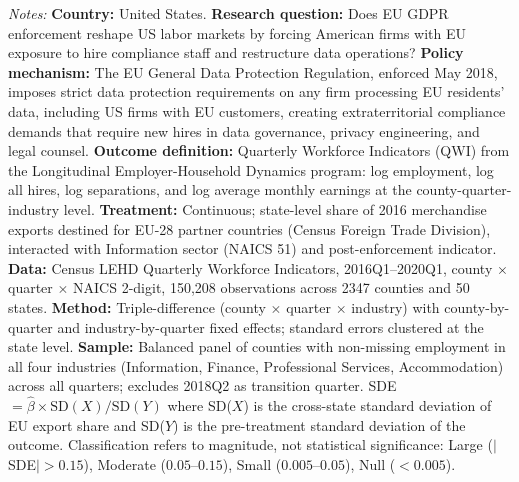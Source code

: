 \begin{table}[t]
\begin{threeparttable}
\begin{tablenotes}[flushleft]
\item \textit{Notes:} \textbf{Country:} United States. \textbf{Research question:} Does EU GDPR enforcement reshape US labor markets by forcing American firms with EU exposure to hire compliance staff and restructure data operations? \textbf{Policy mechanism:} The EU General Data Protection Regulation, enforced May 2018, imposes strict data protection requirements on any firm processing EU residents' data, including US firms with EU customers, creating extraterritorial compliance demands that require new hires in data governance, privacy engineering, and legal counsel. \textbf{Outcome definition:} Quarterly Workforce Indicators (QWI) from the Longitudinal Employer-Household Dynamics program: log employment, log all hires, log separations, and log average monthly earnings at the county-quarter-industry level. \textbf{Treatment:} Continuous; state-level share of 2016 merchandise exports destined for EU-28 partner countries (Census Foreign Trade Division), interacted with Information sector (NAICS 51) and post-enforcement indicator. \textbf{Data:} Census LEHD Quarterly Workforce Indicators, 2016Q1--2020Q1, county $\times$ quarter $\times$ NAICS 2-digit, 150,208 observations across 2347 counties and 50 states. \textbf{Method:} Triple-difference (county $\times$ quarter $\times$ industry) with county-by-quarter and industry-by-quarter fixed effects; standard errors clustered at the state level. \textbf{Sample:} Balanced panel of counties with non-missing employment in all four industries (Information, Finance, Professional Services, Accommodation) across all quarters; excludes 2018Q2 as transition quarter. SDE $= \hat{\beta} \times \text{SD}(X) / \text{SD}(Y)$ where SD($X$) is the cross-state standard deviation of EU export share and SD($Y$) is the pre-treatment standard deviation of the outcome. Classification refers to magnitude, not statistical significance: Large ($|$SDE$| > 0.15$), Moderate ($0.05$--$0.15$), Small ($0.005$--$0.05$), Null ($< 0.005$).
\end{tablenotes}
\end{threeparttable}
\end{table}

